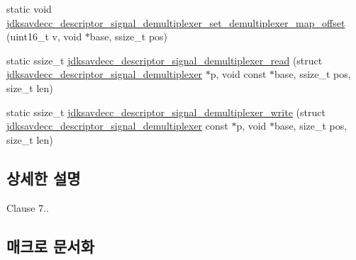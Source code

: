 \begin{DoxyCompactItemize}
\item 
static void \hyperlink{group__descriptor__signal__demultiplexer_ga3a30e7f9e505bf0ea00404654a4e06e2}{jdksavdecc\+\_\+descriptor\+\_\+signal\+\_\+demultiplexer\+\_\+set\+\_\+demultiplexer\+\_\+map\+\_\+offset} (uint16\+\_\+t v, void $\ast$base, ssize\+\_\+t pos)
\item 
static ssize\+\_\+t \hyperlink{group__descriptor__signal__demultiplexer_ga6987274925632cd0e3dfbc1e0eb167ab}{jdksavdecc\+\_\+descriptor\+\_\+signal\+\_\+demultiplexer\+\_\+read} (struct \hyperlink{structjdksavdecc__descriptor__signal__demultiplexer}{jdksavdecc\+\_\+descriptor\+\_\+signal\+\_\+demultiplexer} $\ast$p, void const $\ast$base, ssize\+\_\+t pos, size\+\_\+t len)
\item 
static ssize\+\_\+t \hyperlink{group__descriptor__signal__demultiplexer_gabc32ed4dbf67f627601c80e0decef375}{jdksavdecc\+\_\+descriptor\+\_\+signal\+\_\+demultiplexer\+\_\+write} (struct \hyperlink{structjdksavdecc__descriptor__signal__demultiplexer}{jdksavdecc\+\_\+descriptor\+\_\+signal\+\_\+demultiplexer} const $\ast$p, void $\ast$base, size\+\_\+t pos, size\+\_\+t len)
\end{DoxyCompactItemize}


\subsection{상세한 설명}

\begin{DoxyItemize}
\item Clause 7.. 
\end{DoxyItemize}

\subsection{매크로 문서화}
